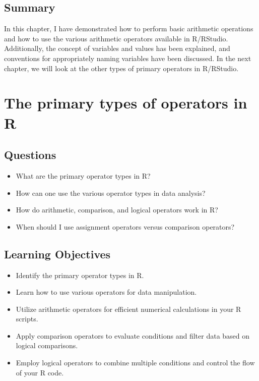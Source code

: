 \documentclass[
  letterpaper,
  DIV=11,
  numbers=noendperiod]{scrreprt}
\begin{document}
\section{Summary}\label{summary-5}

In this chapter, I have demonstrated how to perform basic arithmetic
operations and how to use the various arithmetic operators available in
R/RStudio. Additionally, the concept of variables and values has been
explained, and conventions for appropriately naming variables have been
discussed. In the next chapter, we will look at the other types of
primary operators in R/RStudio.


\chapter{The primary types of operators in R}\label{sec-operators}

\section{Questions}\label{questions-6}

\begin{itemize}
\item
  What are the primary operator types in R?
\item
  How can one use the various operator types in data analysis?
\item
  How do arithmetic, comparison, and logical operators work in R?
\item
  When should I use assignment operators versus comparison operators?
\end{itemize}

\section{Learning Objectives}\label{learning-objectives-6}

\begin{itemize}
\item
  Identify the primary operator types in R.
\item
  Learn how to use various operators for data manipulation.
\item
  Utilize arithmetic operators for efficient numerical calculations in
  your R scripts.
\item
  Apply comparison operators to evaluate conditions and filter data
  based on logical comparisons.
\item
  Employ logical operators to combine multiple conditions and control
  the flow of your R code.
\end{itemize}
\end{document}
